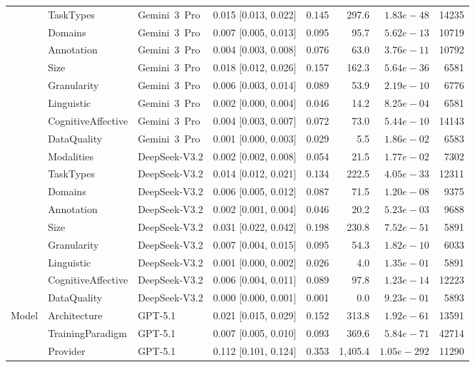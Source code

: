 \begin{table}[H]
\begin{adjustbox}{max width=\textwidth}
\begin{tabular}{llllrrrr}
 & TaskTypes & Gemini~3~Pro & 0.015 [0.013, 0.022] & 0.145 & 297.6 & $1.83e-48$ & 14235 \\
 & Domains & Gemini~3~Pro & 0.007 [0.005, 0.013] & 0.095 & 95.7 & $5.62e-13$ & 10719 \\
 & Annotation & Gemini~3~Pro & 0.004 [0.003, 0.008] & 0.076 & 63.0 & $3.76e-11$ & 10792 \\
 & Size & Gemini~3~Pro & 0.018 [0.012, 0.026] & 0.157 & 162.3 & $5.64e-36$ & 6581 \\
 & Granularity & Gemini~3~Pro & 0.006 [0.003, 0.014] & 0.089 & 53.9 & $2.19e-10$ & 6776 \\
 & Linguistic & Gemini~3~Pro & 0.002 [0.000, 0.004] & 0.046 & 14.2 & $8.25e-04$ & 6581 \\
 & CognitiveAffective & Gemini~3~Pro & 0.004 [0.003, 0.007] & 0.072 & 73.0 & $5.44e-10$ & 14143 \\
 & DataQuality & Gemini~3~Pro & 0.001 [0.000, 0.003] & 0.029 & 5.5 & $1.86e-02$ & 6583 \\
 & Modalities & DeepSeek-V3.2 & 0.002 [0.002, 0.008] & 0.054 & 21.5 & $1.77e-02$ & 7302 \\
 & TaskTypes & DeepSeek-V3.2 & 0.014 [0.012, 0.021] & 0.134 & 222.5 & $4.05e-33$ & 12311 \\
 & Domains & DeepSeek-V3.2 & 0.006 [0.005, 0.012] & 0.087 & 71.5 & $1.20e-08$ & 9375 \\
 & Annotation & DeepSeek-V3.2 & 0.002 [0.001, 0.004] & 0.046 & 20.2 & $5.23e-03$ & 9688 \\
 & Size & DeepSeek-V3.2 & 0.031 [0.022, 0.042] & 0.198 & 230.8 & $7.52e-51$ & 5891 \\
 & Granularity & DeepSeek-V3.2 & 0.007 [0.004, 0.015] & 0.095 & 54.3 & $1.82e-10$ & 6033 \\
 & Linguistic & DeepSeek-V3.2 & 0.001 [0.000, 0.002] & 0.026 & 4.0 & $1.35e-01$ & 5891 \\
 & CognitiveAffective & DeepSeek-V3.2 & 0.006 [0.004, 0.011] & 0.089 & 97.8 & $1.23e-14$ & 12223 \\
 & DataQuality & DeepSeek-V3.2 & 0.000 [0.000, 0.001] & 0.001 & 0.0 & $9.23e-01$ & 5893 \\
Model & Architecture & GPT-5.1 & 0.021 [0.015, 0.029] & 0.152 & 313.8 & $1.92e-61$ & 13591 \\
 & TrainingParadigm & GPT-5.1 & 0.007 [0.005, 0.010] & 0.093 & 369.6 & $5.84e-71$ & 42714 \\
 & Provider & GPT-5.1 & 0.112 [0.101, 0.124] & 0.353 & 1,405.4 & $1.05e-292$ & 11290 \\

\end{tabular}
\end{adjustbox}
\end{table}
